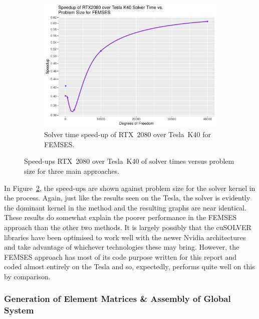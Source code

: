 \begin{figure}
\begin{subfigure}{0.48\linewidth}
		\centering
		\includegraphics[width=\linewidth]{Plots/solve_femses_rtx_speedup_vs_n}
		\caption{Solver time speed-up of RTX~2080 over Tesla~K40 for FEMSES.}
		\label{fig:solve_rtx_femses}
	\end{subfigure}
	\caption{Speed-ups RTX~2080 over Tesla~K40 of solver times versus problem size for three main approaches.}
	\label{fig:solve_rtx}
\end{figure}

In Figure~\ref{fig:solve_rtx}, the speed-ups are shown against problem size for the solver kernel in the process. Again, just like the results seen on the Tesla, the solver is evidently the dominant kernel in the method and the resulting graphs are near identical. These results do somewhat explain the poorer performance in the FEMSES approach than the other two methods. It is largely possibly that the cuSOLVER libraries have been optimised to work well with the newer Nvidia architectures and take advantage of whichever technologies these may bring. However, the FEMSES approach has most of its code purpose written for this report and coded almost entirely on the Tesla and so, expectedly, performs quite well on this by comparison.

\subsubsection{Generation of Element Matrices \& Assembly of Global System}

